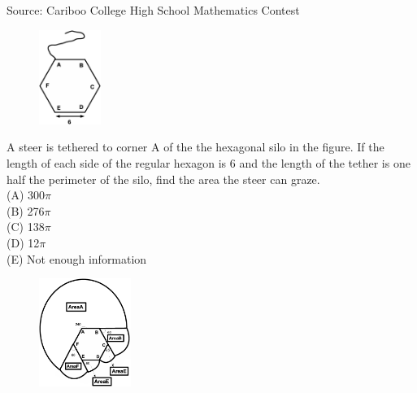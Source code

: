 \documentclass{article}
\begin{document}
\parindent=0cm
\parskip=6pt
\pagestyle{empty}


\scriptsize
Source: Cariboo College High School Mathematics Contest

\normalsize
\begin{figure}
	\includegraphics[width=20mm,viewport=89 57 506 671]{CCSFR73-1pic.eps}
\end{figure}
A steer is tethered to corner A of the the hexagonal silo in the figure.  If the length of each side of the regular hexagon is 6 and the length of the tether is one half the perimeter of the silo, find the area the steer can graze.\\
(A) 300$\pi$\\
(B) 276$\pi$\\
(C) 138$\pi$\\
(D) 12$\pi$\\
(E) Not enough information\\

\begin{figure}
	\includegraphics[width=30mm,viewport=18 78 525 628]{CCSFR73-1pic2.eps}
\end{figure}
\end{document}
